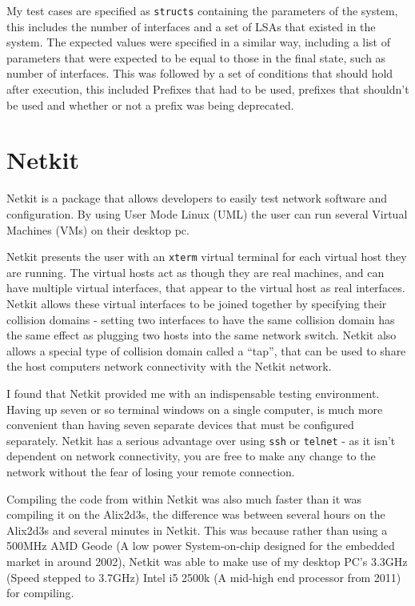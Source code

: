 \documentclass[12pt]{report}
\begin{document}
My test cases are specified as \texttt{structs} containing the parameters of
the system, this includes the number of interfaces and a set of LSAs that
existed in the system. The expected values were specified in a similar way,
including a list of parameters that were expected to be equal to those in the
final state, such as number of interfaces. This was followed by a set of
conditions that should hold after execution, this included Prefixes that had to
be used, prefixes that shouldn't be used and whether or not a prefix was being
deprecated. 

\section{Netkit} 
Netkit is a package that allows developers to easily test network software and
configuration. By using User Mode Linux (UML)  the user can run several Virtual Machines (VMs)
 on their desktop pc. 

Netkit presents the user with an \texttt{xterm} virtual terminal for each
virtual host they are running. The virtual hosts act as though they are real
machines, and can have multiple virtual interfaces, that appear to the virtual
host as real interfaces. Netkit allows these virtual interfaces to be joined
together by specifying their collision domains - setting two interfaces to have
the same collision domain has the same effect as plugging two hosts into the
same network switch. Netkit also allows a special type of collision domain
called a ``tap'', that can be used to share the host computers network
connectivity with the Netkit network.

I found that Netkit provided me with an indispensable testing environment.
Having up seven or so terminal windows on a single computer, is much more
convenient than having seven separate devices that must be configured
separately. Netkit has a serious advantage over using \texttt{ssh} or
\texttt{telnet} - as it isn't dependent on network connectivity, you are free
to make any change to the network without the fear of losing your remote
connection.   

Compiling the code from within Netkit was also much faster than it was
compiling it on the Alix2d3s, the difference was between several hours on the
Alix2d3s and several minutes in Netkit. This was because rather than using a
500MHz AMD Geode (A low power System-on-chip designed for the embedded market
in around 2002), Netkit was able to make use of my desktop PC's 3.3GHz (Speed
stepped to 3.7GHz) Intel i5 2500k (A mid-high end processor from 2011) for
compiling. 
\end{document}
